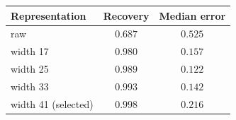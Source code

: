 \begin{tabular}{lcc}
\toprule
\textbf{Representation} & Recovery & Median error \\
\midrule
raw & $0.687$ & $0.525$ \\
width 17 & $0.980$ & $0.157$ \\
width 25 & $0.989$ & $0.122$ \\
width 33 & $0.993$ & $0.142$ \\
width 41 (selected) & $0.998$ & $0.216$ \\
\bottomrule
\end{tabular}
